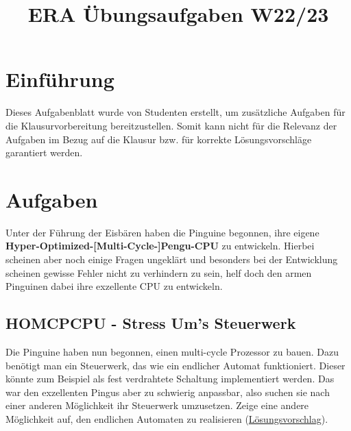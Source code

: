 \documentclass{article}
\title{ERA Übungsaufgaben W22/23}
\begin{document}
\maketitle

\section{Einführung}
Dieses Aufgabenblatt wurde von Studenten erstellt, um zusätzliche Aufgaben für die Klausurvorbereitung bereitzustellen. Somit kann nicht für die Relevanz der Aufgaben im Bezug auf die Klausur bzw. für korrekte Lösungsvorschläge garantiert werden.

\section{Aufgaben}
Unter der Führung der Eisbären haben die Pinguine begonnen, ihre eigene \textbf{Hyper-Optimized-[Multi-Cycle-]Pengu-CPU} zu entwickeln. Hierbei scheinen aber noch einige Fragen ungeklärt und besonders bei der Entwicklung scheinen gewisse Fehler nicht zu verhindern zu sein, helf doch den armen Pinguinen dabei ihre exzellente CPU zu entwickeln.




\subsection{HOMCPCPU - Stress Um's Steuerwerk}
Die Pinguine haben nun begonnen, einen multi-cycle Prozessor zu bauen. Dazu benötigt man ein Steuerwerk, das wie ein endlicher Automat funktioniert. Dieser könnte zum Beispiel als fest verdrahtete Schaltung implementiert werden. Das war den exzellenten Pingus aber zu schwierig anpassbar, also suchen sie nach einer anderen Möglichkeit ihr Steuerwerk umzusetzen. Zeige eine andere Möglichkeit auf, den endlichen Automaten zu realisieren (\hyperref[sec:lsg02]{Lösungsvorschlag}).
\end{document}
